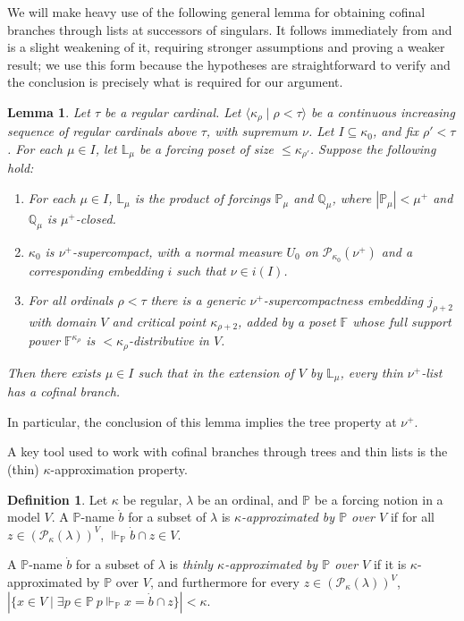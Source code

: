 \documentclass[psamsfonts]{amsart}
\newtheorem{lemma}[thm]{Lemma}
\theoremstyle{definition}
\newtheorem{defn}[thm]{Definition}
\newcommand{\Q}{\mathbb{Q}}
\newcommand{\PP}{\mathbb{P}}
\newcommand{\LL}{\mathbb{L}}
\newcommand{\FF}{\mathbb{F}}
\newcommand{\la}{\lambda}
\newcommand{\ka}{\kappa}
\newcommand{\mc}{\mathcal}
\newcommand{\forces}{\Vdash}
\numberwithin{equation}{section}
\begin{document}
We will make heavy use of the following general lemma for obtaining cofinal branches through lists at successors of singulars. It follows immediately from \cite[Theorem 3.14]{adkisson:ITP} and is a slight weakening of it, requiring stronger assumptions and proving a weaker result; we use this form because the hypotheses are straightforward to verify and the conclusion is precisely what is required for our argument.

\begin{lemma}\label{lem:strtp}
	Let $\tau$ be a regular cardinal. Let $\langle \ka_\rho \mid \rho < \tau\rangle$ be a continuous increasing sequence of regular cardinals above $\tau$, with supremum $\nu$. Let $I \subseteq \ka_0$, and fix $\rho' < \tau$. For each $\mu \in I$, let $\LL_\mu$ be a forcing poset of size $\leq \ka_{\rho'}$. Suppose the following hold:
	\begin{enumerate}
		\item For each $\mu \in I$, $\LL_\mu$ is the product of forcings $\PP_\mu$ and $\Q_\mu$, where $|\PP_\mu|< \mu^+$ and $\Q_\mu$ is $\mu^+$-closed.
		\item $\ka_0$ is $\nu^+$-supercompact, with a normal measure $U_0$ on $\mc{P}_{\ka_0}(\nu^+)$ and a corresponding embedding $i$ such that $\nu \in i(I)$.
		\item For all ordinals $\rho < \tau$ there is a generic $\nu^+$-supercompactness embedding $j_{\rho+2}$ with domain $V$ and critical point $\ka_{\rho+2}$, added by a poset $\FF$ whose full support power $\FF^{\ka_\rho}$ is $<\ka_\rho$-distributive in $V$.
	\end{enumerate}
	Then there exists $\mu \in I$ such that in the extension of $V$ by $\LL_\mu$, every thin $\nu^+$-list has a cofinal branch.
\end{lemma}

In particular, the conclusion of this lemma implies the tree property at $\nu^+$.

A key tool used to work with cofinal branches through trees and thin lists is the (thin) $\ka$-approximation property.

\begin{defn}\label{def:approxed}
	Let $\ka$ be regular, $\la$ be an ordinal, and $\PP$ be a forcing notion in a model $V$. A $\PP$-name $\dot{b}$ for a subset of $\la$ is \emph{$\ka$-approximated by $\PP$ over $V$} if for all $z \in (\mc{P}_{\ka}(\la))^V$, $\forces_\PP \dot{b}\cap z \in V$.
	
	A $\PP$-name $\dot{b}$ for a subset of $\la$ is \emph{thinly $\ka$-approximated by $\PP$ over $V$} if it is $\ka$-approximated by $\PP$ over $V$, and furthermore for every $z \in (\mc{P}_{\ka}(\la))^V$, $|\{x \in V \mid \exists p\in \PP \ p \forces_\PP x = \dot{b}\cap z\}|<\ka$.
\end{defn}
\end{document}
